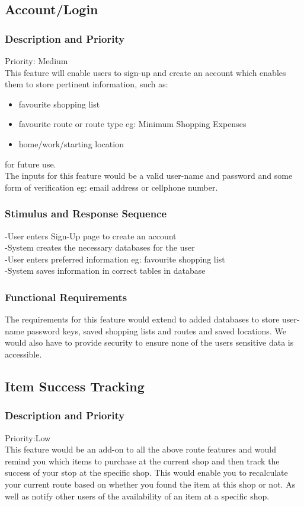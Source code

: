\documentclass[12pt]{article}
\begin{document}
 \subsection{Account/Login}
\subsubsection{Description and Priority}
 Priority: Medium\\
 This feature will enable users to sign-up and create an account which enables them to store pertinent information, such as:\begin{itemize}
  \item favourite shopping list
  \item favourite route or route type eg: Minimum Shopping Expenses
  \item home/work/starting location
\end{itemize}
for future use. \\
The inputs for this feature would be a valid user-name and password and some form of verification eg: email address or cellphone number. 
      
 \subsubsection{Stimulus and Response Sequence}
-User enters Sign-Up page to create an account \\
-System creates the necessary databases for the user\\
-User enters preferred information eg: favourite shopping list\\
-System saves information in correct tables in database
 \subsubsection{Functional Requirements}
The requirements for this feature would extend to added databases to store user-name password keys,  saved shopping lists and routes and saved locations. We would also have to provide security to ensure none of the users sensitive data is accessible. 

 \subsection{Item Success Tracking}
\subsubsection{Description and Priority}
 Priority:Low\\
 This feature would be an add-on to all the above route features and would remind you which items to purchase at the current shop and then track the success of your stop at the specific shop. This would enable you to recalculate your current route based on whether you found the item at this shop or not. As well as notify other users of the availability of an item at a specific shop.  
\end{document}
